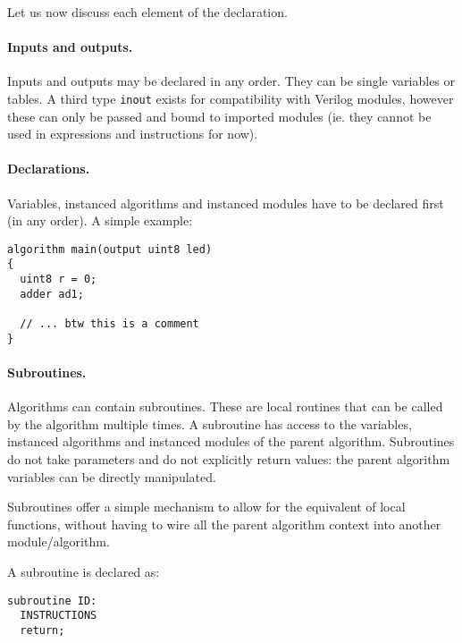 \documentclass[a4]{article}
\newcommand\verilog{Verilog}
\begin{document}
\noindent Let us now discuss each element of the declaration.


\paragraph{Inputs and outputs.}

Inputs and outputs may be declared in any order. They can be single variables or tables.
A third type \texttt{inout} exists for compatibility with \verilog{} modules, however these can only be passed and bound to imported modules (ie. they cannot be used in expressions and instructions for now).


\paragraph{Declarations.} Variables, instanced algorithms and instanced modules have to be declared first (in any order). A simple example:

\begin{verbatim}
algorithm main(output uint8 led)
{
  uint8 r = 0;
  adder ad1;
  
  // ... btw this is a comment
}
\end{verbatim}


\paragraph{Subroutines.}

Algorithms can contain subroutines. These are local routines that can be called by the algorithm multiple times. A subroutine has access to the variables, instanced algorithms and instanced modules of the parent algorithm. Subroutines do not take parameters and do not explicitly return values: the parent algorithm variables can be directly manipulated.

Subroutines offer a simple mechanism to allow for the equivalent of local functions, without having to wire all the parent algorithm context into another module/algorithm.

A subroutine is declared as:

\begin{verbatim}
subroutine ID:
  INSTRUCTIONS
  return;
\end{verbatim}
\end{document}
